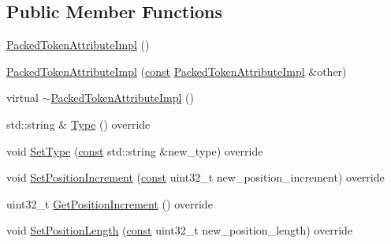 \subsection*{Public Member Functions}
\begin{DoxyCompactItemize}
\item 
\mbox{\hyperlink{classlucene_1_1core_1_1analysis_1_1tokenattributes_1_1PackedTokenAttributeImpl_a11dff73c5a672c0fc89c2f69b5d6366d}{Packed\+Token\+Attribute\+Impl}} ()
\item 
\mbox{\hyperlink{classlucene_1_1core_1_1analysis_1_1tokenattributes_1_1PackedTokenAttributeImpl_a7f5ec442110c91b403513caa53691da4}{Packed\+Token\+Attribute\+Impl}} (\mbox{\hyperlink{ZlibCrc32_8h_a2c212835823e3c54a8ab6d95c652660e}{const}} \mbox{\hyperlink{classlucene_1_1core_1_1analysis_1_1tokenattributes_1_1PackedTokenAttributeImpl}{Packed\+Token\+Attribute\+Impl}} \&other)
\item 
virtual \mbox{\hyperlink{classlucene_1_1core_1_1analysis_1_1tokenattributes_1_1PackedTokenAttributeImpl_affb00f4d610f5827e13a8ede6ff081a7}{$\sim$\+Packed\+Token\+Attribute\+Impl}} ()
\item 
std\+::string \& \mbox{\hyperlink{classlucene_1_1core_1_1analysis_1_1tokenattributes_1_1PackedTokenAttributeImpl_ab9c0b48ded43a3c377136210dcbda215}{Type}} () override
\item 
void \mbox{\hyperlink{classlucene_1_1core_1_1analysis_1_1tokenattributes_1_1PackedTokenAttributeImpl_ad5f1b7e5437154dada3da8cc4f89c642}{Set\+Type}} (\mbox{\hyperlink{ZlibCrc32_8h_a2c212835823e3c54a8ab6d95c652660e}{const}} std\+::string \&new\+\_\+type) override
\item 
void \mbox{\hyperlink{classlucene_1_1core_1_1analysis_1_1tokenattributes_1_1PackedTokenAttributeImpl_a657933594f71883a7271bca05363bc2a}{Set\+Position\+Increment}} (\mbox{\hyperlink{ZlibCrc32_8h_a2c212835823e3c54a8ab6d95c652660e}{const}} uint32\+\_\+t new\+\_\+position\+\_\+increment) override
\item 
uint32\+\_\+t \mbox{\hyperlink{classlucene_1_1core_1_1analysis_1_1tokenattributes_1_1PackedTokenAttributeImpl_aeeb6d5e17fb510c402e36d50e39bb9fb}{Get\+Position\+Increment}} () override
\item 
void \mbox{\hyperlink{classlucene_1_1core_1_1analysis_1_1tokenattributes_1_1PackedTokenAttributeImpl_a3d721b90985cf600d2d44bb5f156d05d}{Set\+Position\+Length}} (\mbox{\hyperlink{ZlibCrc32_8h_a2c212835823e3c54a8ab6d95c652660e}{const}} uint32\+\_\+t new\+\_\+position\+\_\+length) override
\item 

\end{DoxyCompactItemize}
